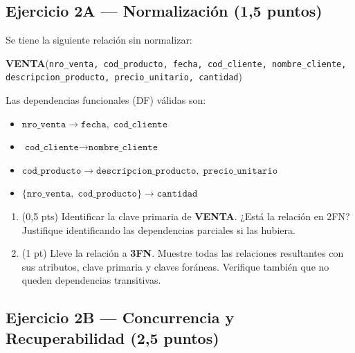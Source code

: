 \documentclass[11pt,a4paper]{article}
\begin{document}
\subsection*{Ejercicio 2A — Normalización \hfill\normalfont(1{,}5 puntos)}

Se tiene la siguiente relación sin normalizar:

\begin{center}
\textbf{VENTA}(\texttt{nro\_venta, cod\_producto, fecha, cod\_cliente, nombre\_cliente,}\\
\texttt{descripcion\_producto, precio\_unitario, cantidad})
\end{center}

Las dependencias funcionales (DF) válidas son:

\begin{itemize}
  \item $\texttt{nro\_venta} \rightarrow \texttt{fecha},\; \texttt{cod\_cliente}$
  \item $\texttt{cod\_cliente} \rightarrow \texttt{nombre\_cliente}$
  \item $\texttt{cod\_producto} \rightarrow \texttt{descripcion\_producto},\; \texttt{precio\_unitario}$
  \item $\{\texttt{nro\_venta},\; \texttt{cod\_producto}\} \rightarrow \texttt{cantidad}$
\end{itemize}

\begin{enumerate}
  \item (0{,}5 pts) Identificar la clave primaria de \textbf{VENTA}. ¿Está la relación en 2FN? Justifique identificando las dependencias parciales si las hubiera.

  \vspace{3.5cm}

  \item (1 pt) Lleve la relación a \textbf{3FN}. Muestre todas las relaciones resultantes con sus atributos, clave primaria y claves foráneas. Verifique también que no queden dependencias transitivas.

  \vspace{5.5cm}
\end{enumerate}

\subsection*{Ejercicio 2B — Concurrencia y Recuperabilidad \hfill\normalfont(2{,}5 puntos)}
\end{document}
